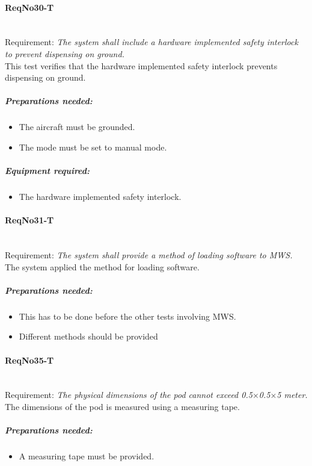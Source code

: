 \paragraph{ReqNo30-T}\mbox{}\\ %
Requirement: \textit{The system shall include a hardware implemented safety interlock to prevent dispensing on ground.}\\

This test verifies that the hardware implemented safety interlock prevents dispensing on ground.
	\subparagraph{Preparations needed:}
	\begin{itemize}
	\item The aircraft must be grounded.
	\item The mode must be set to manual mode.
	\end{itemize}
	
		
	\subparagraph{Equipment required:}
	\begin{itemize}
	\item The hardware implemented safety interlock.
	\end{itemize}

\paragraph{ReqNo31-T}\mbox{}\\ %
Requirement: \textit{The system shall provide a method of loading software to MWS.}\\
The system applied the method for loading software.
	\subparagraph{Preparations needed:}
	\begin{itemize}
	\item This has to be done before the other tests involving MWS.
	\item Different methods should be provided
	\end{itemize}

\paragraph{ReqNo35-T}\mbox{}\\ %
Requirement: \textit{The physical dimensions of the pod cannot exceed 0.5$\times$0.5$\times$5 meter.}
\\
The dimensions of the pod is measured using a measuring tape.

	\subparagraph{Preparations needed:}
	\begin{itemize}
	\item A measuring tape must be provided.
	\end{itemize}

